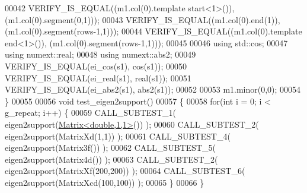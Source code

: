 \begin{DoxyCode}
00042   VERIFY\_IS\_EQUAL((m1.col(0).template start<1>()), (m1.col(0).segment(0,1)));
00043   VERIFY\_IS\_EQUAL((m1.col(0).end(1)), (m1.col(0).segment(rows-1,1)));
00044   VERIFY\_IS\_EQUAL((m1.col(0).template end<1>()), (m1.col(0).segment(rows-1,1)));
00045   
00046   \textcolor{keyword}{using} std::cos;
00047   \textcolor{keyword}{using} numext::real;
00048   \textcolor{keyword}{using} numext::abs2;
00049   VERIFY\_IS\_EQUAL(ei\_cos(s1), cos(s1));
00050   VERIFY\_IS\_EQUAL(ei\_real(s1), real(s1));
00051   VERIFY\_IS\_EQUAL(ei\_abs2(s1), abs2(s1));
00052 
00053   m1.minor(0,0);
00054 \}
00055 
00056 \textcolor{keywordtype}{void} test\_eigen2support()
00057 \{
00058   \textcolor{keywordflow}{for}(\textcolor{keywordtype}{int} i = 0; i < g\_repeat; i++) \{
00059     CALL\_SUBTEST\_1( eigen2support(\hyperlink{group___core___module_class_eigen_1_1_matrix}{Matrix<double,1,1>}()) );
00060     CALL\_SUBTEST\_2( eigen2support(MatrixXd(1,1)) );
00061     CALL\_SUBTEST\_4( eigen2support(Matrix3f()) );
00062     CALL\_SUBTEST\_5( eigen2support(Matrix4d()) );
00063     CALL\_SUBTEST\_2( eigen2support(MatrixXf(200,200)) );
00064     CALL\_SUBTEST\_6( eigen2support(MatrixXcd(100,100)) );
00065   \}
00066 \}
\end{DoxyCode}
